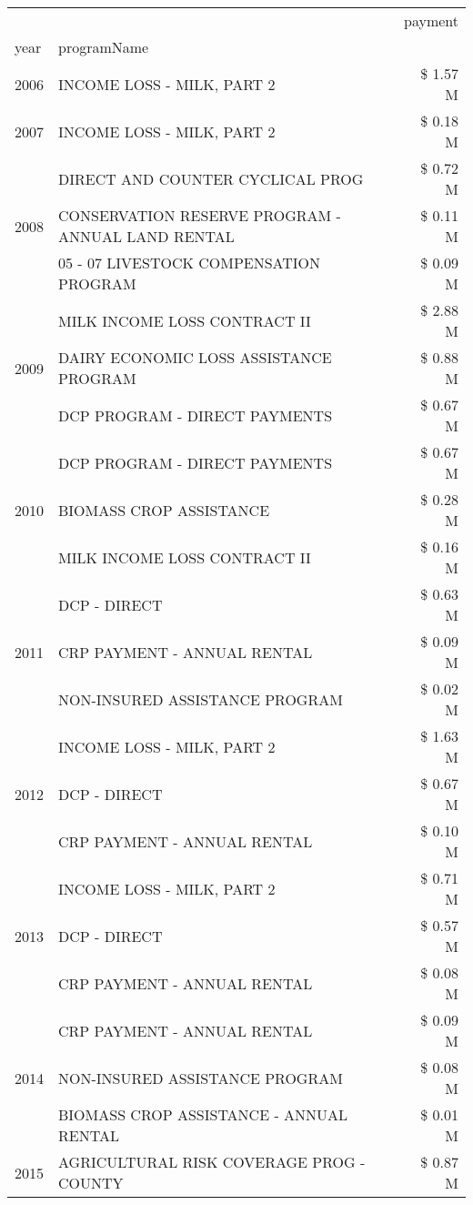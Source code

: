 \begin{tabular}{llr}
\toprule
 &  & payment \\
year & programName &  \\
\midrule
2006 & INCOME LOSS - MILK, PART 2 & \$ 1.57 M \\
\cline{1-3}
2007 & INCOME LOSS - MILK, PART 2 & \$ 0.18 M \\
\cline{1-3}
\multirow[t]{3}{*}{2008} & DIRECT AND COUNTER CYCLICAL PROG & \$ 0.72 M \\
 & CONSERVATION RESERVE PROGRAM - ANNUAL LAND RENTAL & \$ 0.11 M \\
 & 05 - 07 LIVESTOCK COMPENSATION PROGRAM & \$ 0.09 M \\
\cline{1-3}
\multirow[t]{3}{*}{2009} & MILK INCOME LOSS CONTRACT II & \$ 2.88 M \\
 & DAIRY ECONOMIC LOSS ASSISTANCE PROGRAM & \$ 0.88 M \\
 & DCP PROGRAM - DIRECT PAYMENTS & \$ 0.67 M \\
\cline{1-3}
\multirow[t]{3}{*}{2010} & DCP PROGRAM - DIRECT PAYMENTS & \$ 0.67 M \\
 & BIOMASS CROP ASSISTANCE & \$ 0.28 M \\
 & MILK INCOME LOSS CONTRACT II & \$ 0.16 M \\
\cline{1-3}
\multirow[t]{3}{*}{2011} & DCP - DIRECT & \$ 0.63 M \\
 & CRP PAYMENT - ANNUAL RENTAL & \$ 0.09 M \\
 & NON-INSURED ASSISTANCE PROGRAM & \$ 0.02 M \\
\cline{1-3}
\multirow[t]{3}{*}{2012} & INCOME LOSS - MILK, PART 2 & \$ 1.63 M \\
 & DCP - DIRECT & \$ 0.67 M \\
 & CRP PAYMENT - ANNUAL RENTAL & \$ 0.10 M \\
\cline{1-3}
\multirow[t]{3}{*}{2013} & INCOME LOSS - MILK, PART 2 & \$ 0.71 M \\
 & DCP - DIRECT & \$ 0.57 M \\
 & CRP PAYMENT - ANNUAL RENTAL & \$ 0.08 M \\
\cline{1-3}
\multirow[t]{3}{*}{2014} & CRP PAYMENT - ANNUAL RENTAL & \$ 0.09 M \\
 & NON-INSURED ASSISTANCE PROGRAM & \$ 0.08 M \\
 & BIOMASS CROP ASSISTANCE - ANNUAL RENTAL & \$ 0.01 M \\
\cline{1-3}
\multirow[t]{3}{*}{2015} & AGRICULTURAL RISK COVERAGE PROG - COUNTY & \$ 0.87 M \\

\end{tabular}
